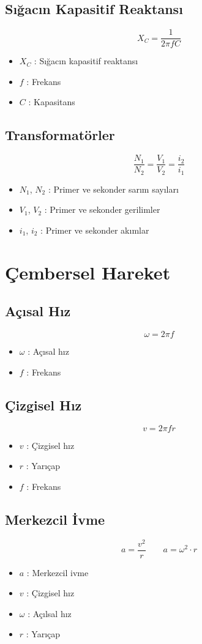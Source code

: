 \documentclass[a4paper, 11pt, titlepage]{article}
\begin{document}
\subsection{Sığacın Kapasitif Reaktansı}
\[
X_C = \frac{1}{2 \pi f C}
\]
\begin{itemize}
  \item $X_C$ : Sığacın kapasitif reaktansı
  \item $f$ : Frekans
  \item $C$ : Kapasitans
\end{itemize}

\subsection{Transformatörler}
\[
\frac{N_1}{N_2} = \frac{V_1}{V_2} = \frac{i_2}{i_1}
\]
\begin{itemize}
  \item $N_1$, $N_2$ : Primer ve sekonder sarım sayıları
  \item $V_1$, $V_2$ : Primer ve sekonder gerilimler
  \item $i_1$, $i_2$ : Primer ve sekonder akımlar
\end{itemize}
\section{Çembersel Hareket}
\subsection{Açısal Hız}
\[
\omega = 2 \pi f
\]
\begin{itemize}
  \item $\omega$ : Açısal hız 
  \item $f$ : Frekans
\end{itemize}

\subsection{Çizgisel Hız}
\[
v = 2 \pi f r
\]
\begin{itemize}
  \item $v$ : Çizgisel hız
  \item $r$ : Yarıçap
  \item $f$ : Frekans
\end{itemize}

\subsection{Merkezcil İvme}
\[
a = \frac{v^2}{r} \qquad a = \omega^2 \cdot r
\]
\begin{itemize}
  \item $a$ : Merkezcil ivme
  \item $v$ : Çizgisel hız
  \item $\omega$ : Açılsal hız
  \item $r$ : Yarıçap
\end{itemize}
\end{document}
